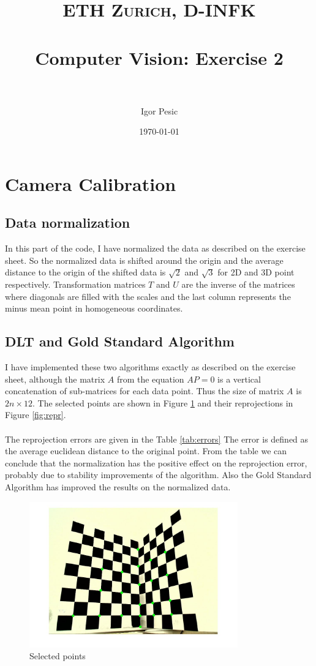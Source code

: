\documentclass[paper=a4, fontsize=11pt]{scrartcl} %
\title{	
\normalfont \normalsize 
\textsc{ETH Zurich, D-INFK} \\ [25pt] %
\horrule{0.5pt} \\[0.4cm] %
\huge Computer Vision: Exercise 2 \\ %
\horrule{2pt} \\[0.5cm] %
}
\author{Igor Pesic} %
\date{\normalsize\today} %
\numberwithin{equation}{section} %
\numberwithin{figure}{section} %
\numberwithin{table}{section} %
\begin{document}
\maketitle %


\section{Camera Calibration}

\subsection{Data normalization}
In this part of the code, I have normalized the data as described on the exercise sheet. So the normalized data is shifted around the origin and the average distance to the origin of the shifted data is $\sqrt{2}$ and $\sqrt{3}$ for 2D and 3D point respectively. Transformation matrices $T$ and $U$ are the inverse of the matrices where diagonals are filled with the scales and the last column represents the minus mean point in homogeneous coordinates. 

\subsection{DLT and Gold Standard Algorithm}
I have implemented these two algorithms exactly as described on the exercise sheet, although the matrix $A$ from the equation $AP=0$ is a vertical concatenation of sub-matrices for each data point. Thus the size of matrix $A$ is $2n \times 12$. The selected points are shown in Figure \ref{fig:orig} and their reprojections in Figure \ref{fig:repr}.\\
\\
The reprojection errors are given in the Table \ref{tab:errors} The error is defined as the average euclidean distance to the original point. From the table we can conclude that the normalization has the positive effect on the reprojection error, probably due to stability improvements of the algorithm. Also the Gold Standard Algorithm has improved the results on the normalized data.

\begin{figure}
	\centering
  	\includegraphics[width=90mm]{data.jpg}
	\caption{Selected points}
	\label{fig:orig}
\end{figure}
\end{document}
